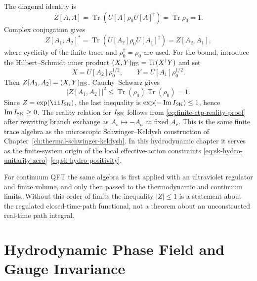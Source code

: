 The diagonal identity is
\[
  Z[A,A]=\operatorname{Tr}(U[A]\rho_0U[A]^\dagger)
  =\operatorname{Tr}\rho_0=1 .
\]
Complex conjugation gives
\begin{equation}
  Z[A_1,A_2]^*
  =
  \operatorname{Tr}\!\left(
  U[A_2]\rho_0U[A_1]^\dagger
  \right)=Z[A_2,A_1],
  \label{eq:finite-ctp-reality-proof}
\end{equation}
where cyclicity of the finite trace and \(\rho_0^\dagger=\rho_0\) are used.
For the bound, introduce the Hilbert--Schmidt inner product
\((X,Y)_{\rm HS}=\operatorname{Tr}(X^\dagger Y)\) and set
\[
  X=U[A_2]\rho_0^{1/2},\qquad
  Y=U[A_1]\rho_0^{1/2}.
\]
Then \(Z[A_1,A_2]=(X,Y)_{\rm HS}\).  Cauchy--Schwarz gives
\begin{equation}
  |Z[A_1,A_2]|^2
  \le
  \operatorname{Tr}(\rho_0)\operatorname{Tr}(\rho_0)=1 .
  \label{eq:finite-ctp-cauchy-schwarz}
\end{equation}
Since \(Z=\exp(\ii I_{\rm SK})\), the last inequality is
\(\exp(-\operatorname{Im}I_{\rm SK})\le1\), hence
\(\operatorname{Im}I_{\rm SK}\ge0\).  The reality relation for
\(I_{\rm SK}\) follows from \eqref{eq:finite-ctp-reality-proof} after
rewriting branch exchange as \(A_a\mapsto -A_a\) at fixed \(A_r\).
This is the same finite trace algebra as the microscopic
Schwinger--Keldysh construction of
Chapter~\ref{ch:thermal-schwinger-keldysh}.  In this hydrodynamic chapter it
serves as the finite-system origin of the local effective-action constraints
\eqref{eq:sk-hydro-unitarity-zero}--\eqref{eq:sk-hydro-positivity}.

For continuum QFT the same algebra is first applied with an ultraviolet
regulator and finite volume, and only then passed to the thermodynamic and
continuum limits.  Without this order of limits the inequality
\(|Z|\le1\) is a statement about the regulated closed-time-path functional,
not a theorem about an unconstructed real-time path integral.

\section{Hydrodynamic Phase Field and Gauge Invariance}


